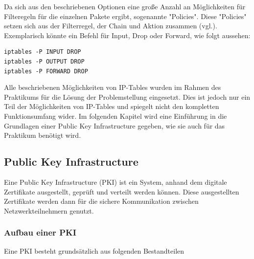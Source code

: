 \documentclass[
a4paper,     %
 headsepline, %
footsepline, %
titlepage,   %
 halfparskip,     %
 fleqn,       %
12pt         %
]{scrartcl}  %
\begin{document}
Da sich aus den beschriebenen Optionen eine große Anzahl an Möglichkeiten für Filteregeln für die einzelnen Pakete ergibt, sogenannte "Policies". Diese "Policies" setzen sich aus der Filterregel, der Chain und Aktion zusammen (vgl.\cite{iptables-1}). Exemplarisch könnte ein Befehl für Input, Drop oder Forward, wie folgt aussehen: 
\begin{lstlisting}[caption={Policies},label=lst:policy]
iptables -P INPUT DROP
iptables -P OUTPUT DROP
iptables -P FORWARD DROP
\end{lstlisting}

Alle beschriebenen Möglichkeiten von IP-Tables wurden im Rahmen des Praktikums für die Lösung der Problemstellung eingesetzt. Dies ist jedoch nur ein Teil der Möglichkeiten von IP-Tables und spiegelt nicht den kompletten Funktionsumfang wider. 
Im folgenden Kapitel wird eine Einführung in die Grundlagen einer Public Key Infrastructure gegeben, wie sie auch für das Praktikum benötigt wird.
\subsection{Public Key Infrastructure}\label{PKI}
Eine Public Key Infrastructure (PKI) ist ein System, anhand dem digitale Zertifikate ausgestellt, geprüft und verteilt werden können. Diese ausgestellten Zertifikate werden dann für die sichere Kommunikation zwischen Netzwerkteilnehmern genutzt.
\subsubsection{Aufbau einer PKI}
Eine PKI besteht grundsätzlich aus folgenden Bestandteilen
\end{document}
